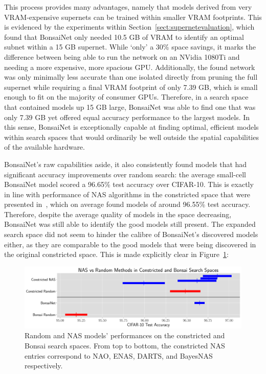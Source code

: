 This process provides many advantages, namely that models derived from very VRAM-expensive supernets can be trained
within smaller VRAM footprints. This is evidenced by the experiments within Section~\ref{sect:supernetevaluation},
which found that BonsaiNet only needed 10.5 GB of VRAM to identify an optimal subnet within a 15 GB supernet. While
`only' a 30\% space savings, it marks the difference between being able to run the network on an NVidia 1080Ti and
needing a more expensive, more spacious GPU. Additionally, the found network was only minimally less accurate than
one isolated directly from pruning the full supernet while requiring a final
VRAM footprint of only 7.39 GB, which is small enough to fit on the majority of consumer GPUs.  Therefore,
in a search space that contained models up 15 GB large, BonsaiNet was able to find one that was only 7.39 GB
yet offered equal accuracy performance to the largest models. In this sense,
BonsaiNet is exceptionally capable at finding optimal, efficient models within search spaces that would
ordinarily be well outside the spatial capabilities of the available hardware.

BonsaiNet's raw capabilities aside, it also consistently found models that had significant accuracy improvements
over random search: the average small-cell BonsaiNet model scored a 96.65\% test accuracy over CIFAR-10. This is exactly
in line with performance of NAS algorithms in the constricted space that were presented in~\cite{yu2019}, which on average
found models of around 96.55\% test accuracy. Therefore, despite the average quality of models in the space decreasing,
BonsaiNet was still able to identify the good models still present. The expanded search space did not seem to hinder
the calibre of BonsaiNet's discovered models either, as they are comparable to the good models that were being discovered
in the original constricted space. This is made explicitly clear in Figure~\ref{fig:nas_v_random}:

\begin{figure}[ht!]
    \centering
  \includegraphics[width=\textwidth]{nas_v_random}
    \caption[Random and NAS models'
    performances on the constricted \citeauthor{yu2019} and Bonsai search spaces]{Random and NAS models'
    performances on the constricted \citeauthor{yu2019} and Bonsai search spaces. From top to bottom, the
    constricted NAS entries correspond to NAO, ENAS, DARTS, and BayesNAS respectively.}
    \label{fig:nas_v_random}
\end{figure}

